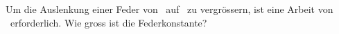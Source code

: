 Um die Auslenkung einer Feder von \sfaO\ auf \sfbO\ zu vergrössern, ist eine Arbeit von \WfaO\ erforderlich. Wie gross ist die Federkonstante?
